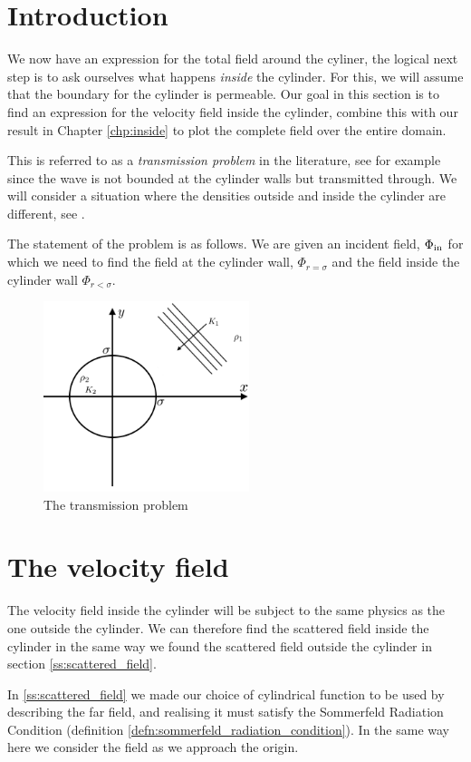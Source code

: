 %
\section{Introduction}
We now have an expression for the total field around the cyliner, the logical next step is to ask ourselves what happens \emph{inside} the cylinder. For this, we will assume that the boundary for the cylinder is permeable. Our goal in this section is to find an expression for the velocity field inside the cylinder, combine this with our result in Chapter \ref{chp:inside} to plot the complete field over the entire domain. \par
%
This is referred to as a \emph{transmission problem} in the literature, see for example \cite[$\S$1.3.3]{martin06scattering} since the wave is not bounded at the cylinder walls but transmitted through. We will consider a situation where the densities outside and inside the cylinder are different, see . \par
%
The statement of the problem is as follows. We are given an incident field, $\Phi_{\text{in}}$ for which we need to find the field at the cylinder wall, $\Phi_{r=\sigma}$ and the field inside the cylinder wall $\Phi_{r<\sigma}$.
%
  \begin{figure} \centering
    \includegraphics[width=6cm]{prob2/prob2_figures/prob2_sketch.png}
    \caption{The transmission problem}\label{fig:problem_2}
  \end{figure}
%
\section{The velocity field}
%
The velocity field inside the cylinder will be subject to the same physics as the one outside the cylinder. We can therefore find the scattered field inside the cylinder in the same way we found the scattered field outside the cylinder in section \ref{ss:scattered_field}. \par
%
In \ref{ss:scattered_field} we made our choice of cylindrical function to be used by describing the far field, and realising it must satisfy the Sommerfeld Radiation Condition (definition \ref{defn:sommerfeld_radiation_condition}). In the same way here we consider the field as we approach the origin.
%
